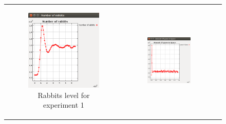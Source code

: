 \documentclass[11pt]{article}
\begin{document}
\begin{figure}
\begin{tabular}{c c c}
\begin{subfigure}[b]{0.3\textwidth}
        \includegraphics[width=\textwidth]{experiment/1/Rabbits.png}
        \caption{\label{img:rabbits1} Rabbits level for experiment 1}
    \end{subfigure} &
    \begin{subfigure}[b]{0.3\textwidth}
        \includegraphics[width=\textwidth]{experiment/2/Grass.png}

\end{subfigure}
\end{tabular}
\end{figure}
\end{document}
